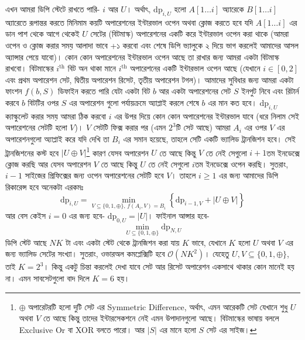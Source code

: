 \begin{solution}
এখন আমরা ডিপি স্টেটে রাখতে পারি- $i$ আর $U$। অর্থাৎ, $\text{dp}_{i, U}$ হলো $A[1 \ldots i]$ অ্যারেকে $B[1 \ldots i]$ অ্যারেতে রূপান্তর করতে মিনিমাম কয়টি অপারেশনের ইন্টারভাল ওপেন অথবা ক্লোজ করতে হবে যদি $A[1\ldots i]$ এর ডান পাশ থেকে আগে থেকেই $U$ সেটের (বিটমাস্ক) অপারেশনের একটি করে ইন্টারভাল ওপেন করা থাকে (আমরা ওপেন ও ক্লোজ করার সময় আলাদা ভাবে +১ করবো এবং শেষে ডিপি ভ্যালুকে ২ দিয়ে ভাগ করলেই আমাদের আসল অ্যান্সার পেয়ে যাবো)। কোন কোন অপারেশনের ইন্টারভাল ওপেন আছে তা রাখার জন্য আমরা একটা বিটমাস্ক রাখবো। বিটমাস্কের $i^{\text{th}}$ বিট অন থাকা মানে $i^{\text{th}}$ অপারেশনের একটি ইন্টারভাল ওপেন আছে (যেখানে $i \in [0, 2]$ এবং প্রথম অপারেশন সেট, দ্বিতীয় অপারেশন রিসেট, তৃতীয় অপারেশন টগল)। আমাদের সুবিধার জন্য আমরা একটা ফাংশন $f(b, S)$ ডিফাইন করতে পারি যেটা একটা বিট $b$ আর একটা অপারেশনের সেট $S$ ইনপুট নিবে এবং রিটার্ন করবে $b$ বিটটির ওপর $S$ এর অপারেশন গুলো পর্যায়ক্রমে অ্যাপ্লাই করলে শেষে $b$ এর মান কত হবে। $\text{dp}_{i, U}$ ক্যাল্কুলেট করার সময় আমরা ঠিক করবো $i$ এর উপর দিয়ে কোন কোন অপারেশনের ইন্টারভাল যাবে (ধরে নিলাম সেই অপারেশনের সেটটি হলো $V$)। $V$ সেটটি ফিক্স করার পর (এমন $2^{3}$টি সেট আছে) আমরা $A_i$ এর ওপর $V$ এর অপারেশনগুলো অ্যাপ্লাই করে যদি দেখি তা $B_i$ এর সমান হয়েছে, তাহলে সেটি একটি ভ্যালিড ট্রানজিশন হবে। সেই ট্রানজিশনের কস্ট হবে $|U \oplus V|$\footnote{$\oplus$ অপারেটরটি হলো দুটি সেট এর Symmetric Difference, অর্থাৎ, এমন আরেকটি সেট যেখানে শুধু $U$ অথবা $V$ তে আছে কিন্তু তাদের ইন্টারসেকশনে নেই এমন উপাদানগুলো আছে। বিটমাস্কের ভাষায় বললে Exclusive Or বা XOR বলতে পারো। আর $|S|$ এর মানে হলো $S$ সেট এর সাইজ।} কারণ যেসব অপারেশন $U$ তে আছে কিন্তু $V$ তে নেই সেগুলো $i+1$তম ইনডেক্সে ক্লোজ করছি আর যেসব অপারেশন $V$ তে আছে কিন্তু $U$ তে নেই সেগুলো $i$তম ইনডেক্সে ওপেন করছি। সুতরাং, $i-1$ সাইজের প্রিফিক্সের জন্য ওপেন অপারেশনের সেটটি হবে $V$। তাহলে $i \ge 1$ এর জন্য আমাদের ডিপি রিকারেন্স হবে অনেকটা এরকমঃ
\begin{equation*}
\text{dp}_{i,U} = \min_{V \subseteq \{0, 1, \oplus\},\, f(A_i, V) = B_i} \left \{ \text{dp}_{i-1, V} + |U \oplus V| \right \}
\end{equation*}
আর বেস কেইস $i=0$ এর জন্য হবে- $\text{dp}_{0, U} = |U|$। ফাইনাল আন্সার হবে-
\[
  \min_{U \subseteq \{0, 1, \oplus\}} \text{dp}_{N,U}
\]
ডিপি স্টেট আছে $NK$ টা এবং একটা স্টেট থেকে ট্রানজিশন করা যায় $K$ ভাবে, যেখানে $K$ হলো $U$ অথবা $V$ এর জন্য ভ্যালিড সেটের সংখ্যা। সুতরাং, ওভারঅল কমপ্লেক্সিটি হবে $\mathcal{O}(NK^2)$। যেহেতু $U, V \subseteq \{0, 1, \oplus\}$, তাই $K = 2^3$। কিন্তু একটু চিন্তা করলেই দেখা যাবে সেট আর রিসেট অপারেশন একসাথে থাকার কোন মানেই হয় না। এমন সাবসেটগুলো বাদ দিলে $K=6$ হয়।
\end{solution}

